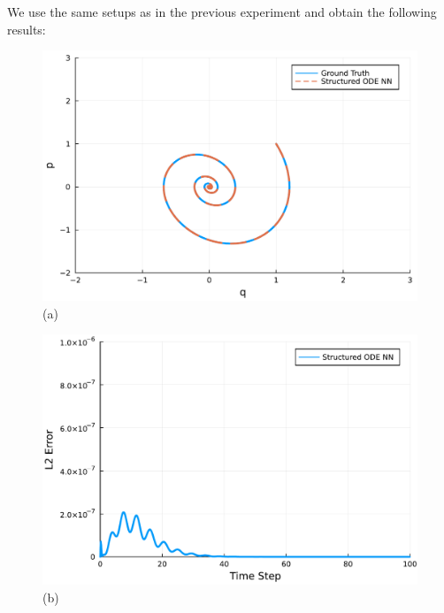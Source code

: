 \documentclass[
	parskip, 			   %
	twoside, 			   %
	DIV=14, 			   %
	BCOR=15.0mm, 		   %
	headsepline, 		   %
	open=right, 		   %
	captions=tableheading, %
	bibliography=totoc,    %
	numbers=noenddot       %
]{scrreprt}
\begin{document}
We use the same setups as in the previous experiment and obtain the following results:

\clearpage
\begin{figure}[h!]
    \centering
    \begin{minipage}{.3\textwidth}
    \centering
    \includegraphics[width=1\linewidth]{figures/phase_portrait_compositional_ndho_with_EPHS_structure.pdf}
    \\(a)
    \end{minipage}%
    \begin{minipage}{.3\textwidth}
    \centering
    \includegraphics[width=1\linewidth]{figures/prediction_error_compositional_ndho_with_EPHS_structure.pdf}
    \\(b)
    \end{minipage}%
    \begin{minipage}{.3\textwidth}
    \centering

\end{minipage}
\end{figure}
\end{document}
